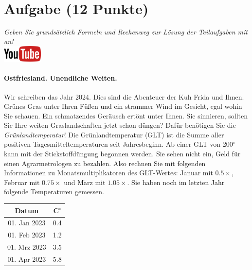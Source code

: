 \documentclass[a4paper, 9pt]{scrartcl}\usepackage[]{graphicx}\usepackage[]{xcolor}
\begin{document}
\clearpage

\section{Aufgabe \hfill (12 Punkte)}

\textit{Geben Sie grunds{\"a}tzlich Formeln und Rechenweg zur L{\"o}sung der
  Teilaufgaben mit an!} \\[1Ex]

\hfill\href{https://youtu.be/fiWGgCX-cE4}{\includegraphics[width =
  2cm]{img/youtube}} %
\hspace{2Ex}



\paragraph{Ostfriesland. Unendliche Weiten.}



Wir schreiben das Jahr 2024. Dies sind die Abenteuer
der Kuh Frida und Ihnen. Gr{\"u}nes Gras unter Ihren F{\"u}{\ss}en und
ein strammer Wind im Gesicht, egal wohin Sie schauen. Ein schmatzendes
Ger{\"a}usch ert{\"o}nt unter Ihnen. Sie sinnieren, sollten Sie Ihre weiten
Graslandschaften jetzt schon d{\"u}ngen?  Daf{\"u}r ben{\"o}tigen Sie die
\textit{Gr{\"u}nlandtemperatur}! Die Gr{\"u}nlandtemperatur (GLT) ist die Summe aller
positiven Tagesmitteltemperaturen seit Jahresbeginn. Ab einer GLT von
200$^\circ$ kann mit der Stickstoffd{\"u}ngung begonnen werden. Sie sehen nicht
ein, Geld f{\"u}r einen Agrarmetrologen zu bezahlen. Also rechnen Sie mit
folgenden Informationen zu Monatsmultiplikatoren des GLT-Wertes: Januar mit
$0.5\times$, Februar mit $0.75\times$ und M{\"a}rz mit
$1.05\times$. Sie haben noch im letzten Jahr folgende Temperaturen
gemessen.

\begin{center}
\begin{tabular}{cc}
  \toprule
  Datum & C$^\circ$ \\
  \midrule
  01. Jan 2023 & 0.4\\
  01. Feb 2023 & 1.2\\
  01. Mrz 2023 & 3.5\\
  01. Apr 2023 & 5.8\\
  \bottomrule
\end{tabular}
\end{center}
\end{document}
